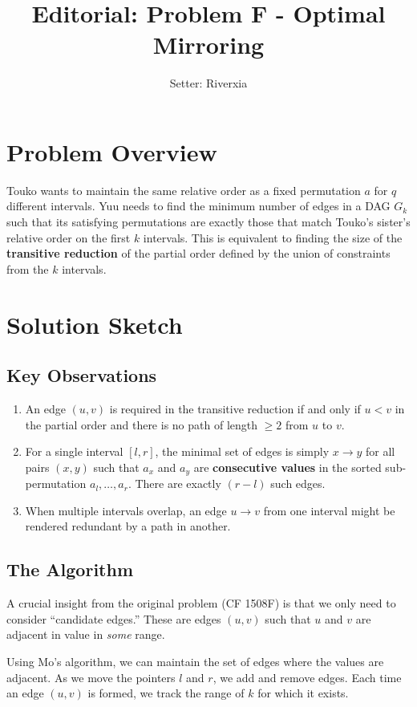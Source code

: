 \documentclass[11pt]{article}
\title{\textbf{Editorial: Problem F - Optimal Mirroring}}
\author{Setter: Riverxia}
\date{}
\begin{document}
\maketitle

\section*{Problem Overview}
Touko wants to maintain the same relative order as a fixed permutation $a$ for $q$ different intervals. Yuu needs to find the minimum number of edges in a DAG $G_k$ such that its satisfying permutations are exactly those that match Touko's sister's relative order on the first $k$ intervals. This is equivalent to finding the size of the \textbf{transitive reduction} of the partial order defined by the union of constraints from the $k$ intervals.

\section*{Solution Sketch}

\subsection*{Key Observations}
\begin{enumerate}
    \item An edge $(u, v)$ is required in the transitive reduction if and only if $u < v$ in the partial order and there is no path of length $\ge 2$ from $u$ to $v$.
    \item For a single interval $[l, r]$, the minimal set of edges is simply $x \to y$ for all pairs $(x, y)$ such that $a_x$ and $a_y$ are \textbf{consecutive values} in the sorted sub-permutation $a_l, \dots, a_r$. There are exactly $(r-l)$ such edges.
    \item When multiple intervals overlap, an edge $u \to v$ from one interval might be rendered redundant by a path in another.
\end{enumerate}

\subsection*{The Algorithm}
A crucial insight from the original problem (CF 1508F) is that we only need to consider ``candidate edges.'' These are edges $(u, v)$ such that $u$ and $v$ are adjacent in value in \textit{some} range.

Using Mo's algorithm, we can maintain the set of edges where the values are adjacent. As we move the pointers $l$ and $r$, we add and remove edges. Each time an edge $(u, v)$ is formed, we track the range of $k$ for which it exists.
\end{document}
